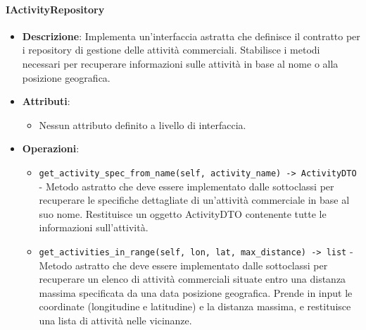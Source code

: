 \documentclass[10pt]{article}
\begin{document}
    \paragraph{IActivityRepository}
    \begin{itemize} 
    \item \textbf{Descrizione}: Implementa un'interfaccia astratta che definisce il contratto per i repository di gestione delle attività commerciali. Stabilisce i metodi necessari per recuperare informazioni sulle attività in base al nome o alla posizione geografica.
    \item \textbf{Attributi}:
    \begin{itemize}
        \item Nessun attributo definito a livello di interfaccia.
    \end{itemize}
    
    \item \textbf{Operazioni}:
    \begin{itemize}
        \item \texttt{get\_activity\_spec\_from\_name(self, activity\_name) -> ActivityDTO} - Metodo astratto che deve essere implementato dalle sottoclassi per recuperare le specifiche dettagliate di un'attività commerciale in base al suo nome. Restituisce un oggetto ActivityDTO contenente tutte le informazioni sull'attività.
        
        \item \texttt{get\_activities\_in\_range(self, lon, lat, max\_distance) -> list} - Metodo astratto che deve essere implementato dalle sottoclassi per recuperare un elenco di attività commerciali situate entro una distanza massima specificata da una data posizione geografica. Prende in input le coordinate (longitudine e latitudine) e la distanza massima, e restituisce una lista di attività nelle vicinanze.
    \end{itemize}
    \end{itemize}
\end{document}
